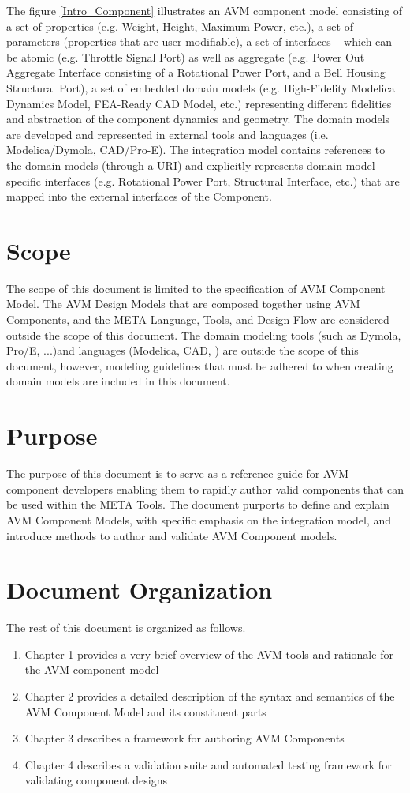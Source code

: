 The figure \ref{Intro_Component} illustrates an AVM component model consisting of a set of properties (e.g. Weight, Height, Maximum Power, etc.), a set of parameters (properties that are user modifiable), a set of interfaces – which can be atomic (e.g. Throttle Signal Port) as well as aggregate (e.g. Power Out Aggregate Interface consisting of a Rotational Power Port, and a Bell Housing Structural Port), a set of embedded domain models (e.g. High-Fidelity Modelica Dynamics Model, FEA-Ready CAD Model, etc.) representing different fidelities and abstraction of the component dynamics and geometry. The domain models are developed and represented in external tools and languages (i.e. Modelica/Dymola, CAD/Pro-E). The integration model contains references to the domain models (through a URI) and explicitly represents domain-model specific interfaces (e.g. Rotational Power Port, Structural Interface, etc.) that are mapped into the external interfaces of the Component.

\section{Scope}
The scope of this document is limited to the specification of AVM Component Model. The AVM Design Models that are composed together using AVM Components, and the META Language, Tools, and Design Flow are considered outside the scope of this document. The domain modeling tools (such as Dymola, Pro/E, ...)and languages (Modelica, CAD, ) are outside the scope of this document, however, modeling guidelines that must be adhered to when creating domain models are included in this document.

\section{Purpose}
The purpose of this document is to serve as a reference guide for AVM component developers enabling them to rapidly author valid components that can be used within the META Tools. The document purports to define and explain AVM Component Models, with specific emphasis on the integration model, and introduce methods to author and validate AVM Component models.


\section{Document Organization}
The rest of this document is organized as follows. 
\begin{enumerate}
\item Chapter 1 provides a very brief overview of the AVM tools and rationale for the AVM component model
\item Chapter 2 provides a detailed description of the syntax and semantics of the AVM Component Model and its constituent parts
\item Chapter 3 describes a framework for authoring AVM Components
\item Chapter 4 describes a validation suite and automated testing framework for validating component designs
\end{enumerate}